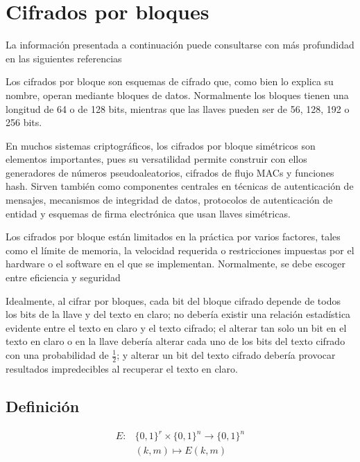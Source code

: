 %
%

\section{Cifrados por bloques}

La información presentada a continuación puede consultarse con más profundidad
en las siguientes referencias
\cite{menezes, DBLP:series/isc/DelfsK07}

Los cifrados por bloque son esquemas de cifrado que, como bien
lo explica su nombre, operan mediante bloques de datos. Normalmente los
bloques tienen una longitud de 64 o de 128 bits, mientras que las llaves
pueden ser de 56, 128, 192 o 256 bits.

En muchos sistemas criptográficos, los cifrados por bloque simétricos
son elementos importantes, pues su versatilidad permite construir con
ellos generadores de números pseudoaleatorios, cifrados de flujo MACs y
funciones hash. Sirven también como componentes centrales en técnicas de
autenticación de mensajes, mecanismos de integridad de datos, protocolos
de autenticación de entidad y esquemas de firma electrónica que usan
llaves simétricas.

Los cifrados por bloque están limitados en la práctica por varios
factores, tales como el límite de memoria, la velocidad requerida o
restricciones impuestas por el hardware o el software en el que se
implementan. Normalmente, se debe escoger entre eficiencia y seguridad

Idealmente, al cifrar por bloques, cada bit del bloque cifrado depende
de todos los bits de la llave y del texto en claro; no debería existir
una relación estadística evidente entre el texto en claro y el texto
cifrado; el alterar tan solo un bit en el texto en claro o en la llave
debería alterar cada uno de los bits del texto cifrado con una
probabilidad de $\frac{1}{2}$; y alterar un bit del texto cifrado
debería provocar resultados impredecibles al recuperar el texto en
claro.

\subsection{Definición}

\begin{equation}
  \label{cifrado_bloques_def}
  \begin{aligned}
    E: {}& \{0,1\}^r \times \{0,1\}^n \longrightarrow \{0,1\}^n \\
         &(k,m) \longmapsto  E(k,m)
  \end{aligned}
\end{equation}


